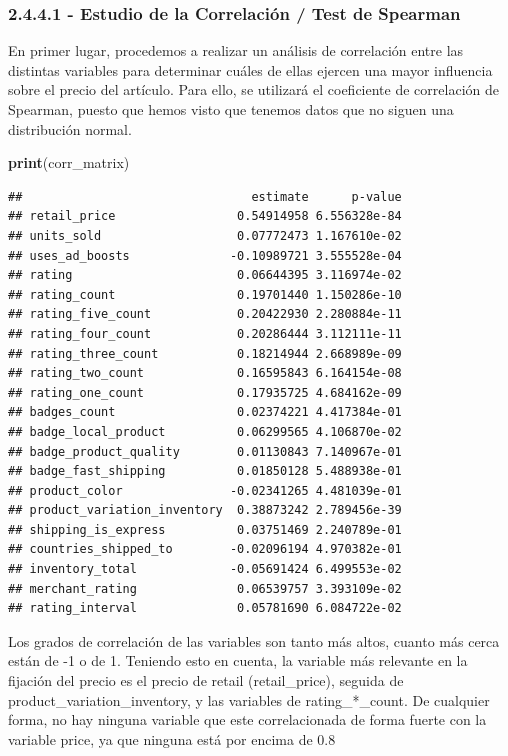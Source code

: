 \documentclass[
]{article}
\newenvironment{Shaded}{\begin{snugshade}}{\end{snugshade}}
\newcommand{\KeywordTok}[1]{\textcolor[rgb]{0.13,0.29,0.53}{\textbf{#1}}}
\newcommand{\NormalTok}[1]{#1}
\begin{document}
\hypertarget{estudio-de-la-correlaciuxf3n-test-de-spearman}{%
\subsubsection{2.4.4.1 - Estudio de la Correlación / Test de
Spearman}\label{estudio-de-la-correlaciuxf3n-test-de-spearman}}

En primer lugar, procedemos a realizar un análisis de correlación entre
las distintas variables para determinar cuáles de ellas ejercen una
mayor influencia sobre el precio del artículo. Para ello, se utilizará
el coeficiente de correlación de Spearman, puesto que hemos visto que
tenemos datos que no siguen una distribución normal.

\begin{Shaded}
\begin{Highlighting}[]
\KeywordTok{print}\NormalTok{(corr_matrix)}
\end{Highlighting}
\end{Shaded}

\begin{verbatim}
##                                estimate      p-value
## retail_price                 0.54914958 6.556328e-84
## units_sold                   0.07772473 1.167610e-02
## uses_ad_boosts              -0.10989721 3.555528e-04
## rating                       0.06644395 3.116974e-02
## rating_count                 0.19701440 1.150286e-10
## rating_five_count            0.20422930 2.280884e-11
## rating_four_count            0.20286444 3.112111e-11
## rating_three_count           0.18214944 2.668989e-09
## rating_two_count             0.16595843 6.164154e-08
## rating_one_count             0.17935725 4.684162e-09
## badges_count                 0.02374221 4.417384e-01
## badge_local_product          0.06299565 4.106870e-02
## badge_product_quality        0.01130843 7.140967e-01
## badge_fast_shipping          0.01850128 5.488938e-01
## product_color               -0.02341265 4.481039e-01
## product_variation_inventory  0.38873242 2.789456e-39
## shipping_is_express          0.03751469 2.240789e-01
## countries_shipped_to        -0.02096194 4.970382e-01
## inventory_total             -0.05691424 6.499553e-02
## merchant_rating              0.06539757 3.393109e-02
## rating_interval              0.05781690 6.084722e-02
\end{verbatim}

Los grados de correlación de las variables son tanto más altos, cuanto
más cerca están de -1 o de 1. Teniendo esto en cuenta, la variable más
relevante en la fijación del precio es el precio de retail
(retail\_price), seguida de product\_variation\_inventory, y las
variables de rating\_*\_count. De cualquier forma, no hay ninguna
variable que este correlacionada de forma fuerte con la variable price,
ya que ninguna está por encima de 0.8
\end{document}
